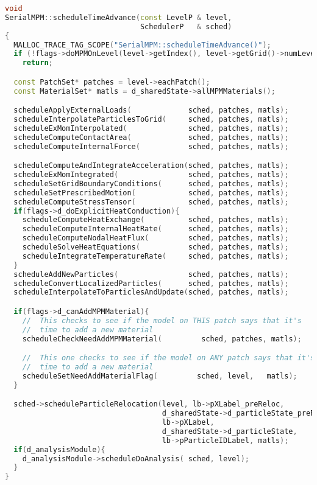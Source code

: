 \begin{lstlisting}[language=Cpp]
void
SerialMPM::scheduleTimeAdvance(const LevelP & level,
                               SchedulerP   & sched)
{
  MALLOC_TRACE_TAG_SCOPE("SerialMPM::scheduleTimeAdvance()");
  if (!flags->doMPMOnLevel(level->getIndex(), level->getGrid()->numLevels()))
    return;

  const PatchSet* patches = level->eachPatch();
  const MaterialSet* matls = d_sharedState->allMPMMaterials();

  scheduleApplyExternalLoads(             sched, patches, matls);
  scheduleInterpolateParticlesToGrid(     sched, patches, matls);
  scheduleExMomInterpolated(              sched, patches, matls);
  scheduleComputeContactArea(             sched, patches, matls);
  scheduleComputeInternalForce(           sched, patches, matls);

  scheduleComputeAndIntegrateAcceleration(sched, patches, matls);
  scheduleExMomIntegrated(                sched, patches, matls);
  scheduleSetGridBoundaryConditions(      sched, patches, matls);
  scheduleSetPrescribedMotion(            sched, patches, matls);
  scheduleComputeStressTensor(            sched, patches, matls);
  if(flags->d_doExplicitHeatConduction){
    scheduleComputeHeatExchange(          sched, patches, matls);
    scheduleComputeInternalHeatRate(      sched, patches, matls);
    scheduleComputeNodalHeatFlux(         sched, patches, matls);
    scheduleSolveHeatEquations(           sched, patches, matls);
    scheduleIntegrateTemperatureRate(     sched, patches, matls);
  }
  scheduleAddNewParticles(                sched, patches, matls);
  scheduleConvertLocalizedParticles(      sched, patches, matls);
  scheduleInterpolateToParticlesAndUpdate(sched, patches, matls);

  if(flags->d_canAddMPMMaterial){
    //  This checks to see if the model on THIS patch says that it's
    //  time to add a new material
    scheduleCheckNeedAddMPMMaterial(         sched, patches, matls);

    //  This one checks to see if the model on ANY patch says that it's
    //  time to add a new material
    scheduleSetNeedAddMaterialFlag(         sched, level,   matls);
  }

  sched->scheduleParticleRelocation(level, lb->pXLabel_preReloc,
                                    d_sharedState->d_particleState_preReloc,
                                    lb->pXLabel,
                                    d_sharedState->d_particleState,
                                    lb->pParticleIDLabel, matls);
  if(d_analysisModule){
    d_analysisModule->scheduleDoAnalysis( sched, level);
  }
}
\end{lstlisting}

